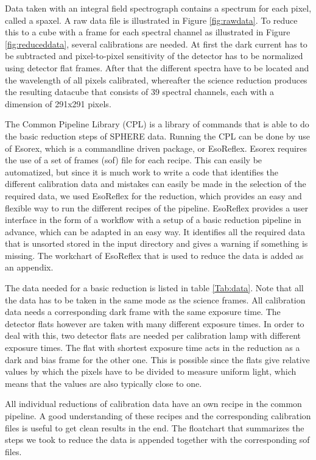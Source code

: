 \documentclass[twoside,single,12pt]{lion-msc}
\begin{document}
Data taken with an integral field spectrograph contains a spectrum for each pixel, called a spaxel. A raw data file is illustrated in Figure \ref{fig:rawdata}. To reduce this to a cube with a frame for each spectral channel as illustrated in Figure \ref{fig:reduceddata}, several calibrations are needed. At first the dark current has to be subtracted and pixel-to-pixel sensitivity of the detector has to be normalized using detector flat frames. After that the different spectra have to be located and the wavelength of all pixels calibrated, whereafter the science reduction produces the resulting datacube that consists of 39 spectral channels, each with a dimension of 291x291 pixels.
\bigskip

The Common Pipeline Library (CPL)\citep{Observatory2007} is a library of commands that is able to do the basic reduction steps of SPHERE data. Running the CPL can be done by use of Esorex, which is a commandline driven package, or EsoReflex. Esorex requires the use of a set of frames (sof) file for each recipe. This can easily be automatized, but since it is much work to write a code that identifies the different calibration data and mistakes can easily be made in the selection of the required data, we used EsoReflex for the reduction, which provides an easy and flexible way to run the different recipes of the pipeline. EsoReflex provides a user interface in the form of a workflow with a setup of a basic reduction pipeline in advance, which can be adapted in an easy way. It identifies all the required data that is unsorted stored in the input directory and gives a warning if something is missing. The workchart of EsoReflex that is used to reduce the data is added as an appendix.
\bigskip

The data needed for a basic reduction is listed in table \ref{Tab:data}. Note that all the data has to be taken in the same mode as the science frames. All calibration data needs a corresponding dark frame with the same exposure time. The detector flats however are taken with many different exposure times. In order to deal with this, two detector flats are needed per calibration lamp with different exposure times. The flat with shortest exposure time acts in the reduction as a dark and bias frame for the other one. This is possible since the flats give relative values by which the pixels have to be divided to measure uniform light, which means that the values are also typically close to one. 
\bigskip

All individual reductions of calibration data have an own recipe in the common pipeline. A good understanding of these recipes and the corresponding calibration files is useful to get clean results in the end. The floatchart that summarizes the steps we took to reduce the data is appended together with the corresponding sof files.
\end{document}
